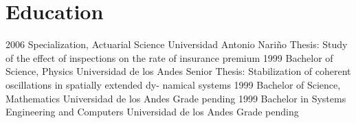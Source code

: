 \section{Education}
\begin{entrylist}
  \entry
     {2006}
     {Specialization, Actuarial Science}
	{Universidad Antonio Nariño}
	{Thesis: Study of the effect of inspections on the rate of insurance premium}
  \entry
	{1999}
	{Bachelor of Science, Physics}
	{Universidad de los Andes}
	{Senior Thesis: Stabilization of coherent oscillations in spatially extended dy-
	namical systems}
  \entry
	{1999}
	{Bachelor of Science, Mathematics}
	{Universidad de los Andes}
	{Grade pending}
  \entry
	{1999}
	{Bachelor in Systems Engineering and Computers}
	{Universidad de los Andes}
	{Grade pending}
\end{entrylist}
